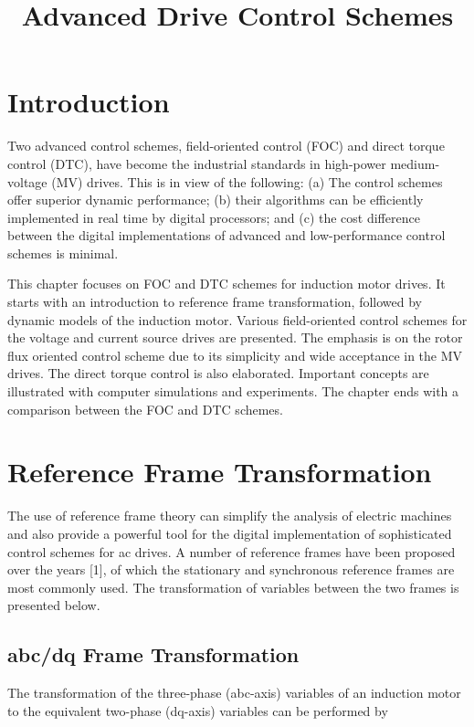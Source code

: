 \documentclass[letterpaper,12pt]{article}
\title{Advanced Drive Control Schemes}
\author{}
\date{}
\begin{document}
\maketitle
\thispagestyle{fancy} %

\section{Introduction}

Two advanced control schemes, field-oriented control (FOC) and direct torque control (DTC), have become the industrial standards in high-power medium-voltage (MV) drives. This is in view of the following: (a) The control schemes offer superior dynamic performance; (b) their algorithms can be efficiently implemented in real time by digital processors; and (c) the cost difference between the digital implementations of advanced and low-performance control schemes is minimal.

This chapter focuses on FOC and DTC schemes for induction motor drives. It starts with an introduction to reference frame transformation, followed by dynamic models of the induction motor. Various field-oriented control schemes for the voltage and current source drives are presented. The emphasis is on the rotor flux oriented control scheme due to its simplicity and wide acceptance in the MV drives. The direct torque control is also elaborated. Important concepts are illustrated with computer simulations and experiments. The chapter ends with a comparison between the FOC and DTC schemes.

\section{Reference Frame Transformation}

The use of reference frame theory can simplify the analysis of electric machines and also provide a powerful tool for the digital implementation of sophisticated control schemes for ac drives. A number of reference frames have been proposed over the years [1], of which the stationary and synchronous reference frames are most commonly used. The transformation of variables between the two frames is presented below.

\subsection{abc/dq Frame Transformation}

The transformation of the three-phase (abc-axis) variables of an induction motor to the equivalent two-phase (dq-axis) variables can be performed by
\end{document}
